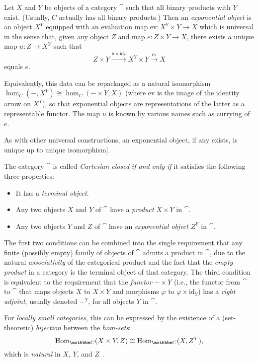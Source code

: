 \documentclass[a4paper,11pt]{article}  %
\begin{document}
\begin{definition}\label{def:expoObj}
Let $X$ and $Y$ be objects of a category $\cat$ such that all binary products with $Y$ exist.  
(Usually, $C$ actually has all binary products.)  
Then an \emph{exponential object} is an object $X^Y$ equipped with an evaluation map $\mathrm{ev}\colon X^Y \times Y \to X$ which is universal in the sense that, given any object $Z$ and map $e\colon Z \times Y \to X$, there exists a unique map $u\colon Z \to X^Y$ such that
$$ Z \times Y \stackrel{u \times \mathrm{id}_Y}\to X^Y \times Y \stackrel{\mathrm{ev}}\to X $$
equals $e$.

Equivalently, this data can be repackaged as a natural isomorphism $\hom_C(-, X^Y) \cong \hom_C(- \times Y, X)$ (where $\mathrm{ev}$ is the image of the identity arrow on $X^Y$), so that exponential objects are representations of the latter as a representable functor.
The map $u$ is known by various names such as  currying  of $e$.  

As with other  universal constructions, an exponential object, if any exists, is  unique up to unique isomorphism].
\end{definition}

\begin{definition}\label{def:CartClosed}
The category $\cat$ is called \emph{Cartesian closed} \emph{if and only if} it satisfies the following three properties:

\begin{itemize}
    \item It has a \emph{terminal object}.
    \item Any two objects \(X\) and \(Y\) of $\cat$ have a \emph{product} \(X \times Y\) in $\cat$.
    \item Any two objects \(Y\) and \(Z\) of $\cat$ have an \emph{exponential object} \(Z^Y\) in $\cat$.
\end{itemize}
\end{definition}

\begin{remark}
	The first two conditions can be combined into the single requirement that any finite (possibly empty) family of objects of $\cat$ admits a product in $\cat$, due to the natural \emph{associativity} of the categorical product and the fact that the \emph{empty product} in a category is the terminal object of that category.
	The third condition is equivalent to the requirement that the \emph{functor} \(- \times Y\) (i.e., the functor from $\cat$ to $\cat$ that maps objects \(X\) to \(X \times Y\) and morphisms \(\varphi\) to \(\varphi \times \mathrm{id}_Y\)) has a \emph{right adjoint}, usually denoted \(-^Y\), for all objects \(Y\) in $\cat$. 
	
	For \emph{locally small categories}, this can be expressed by the existence of a (set-theoretic) \emph{bijection} between the \emph{hom-sets}:
\[
\Hom_{\cat}(X \times Y, Z) \cong \Hom_{\cat}(X, Z^Y),
\]
	which is \emph{natural} in \(X\), \(Y\), and \(Z\)~\cite{nlab:cartesian_closed_category}.
\end{remark}
\end{document}
